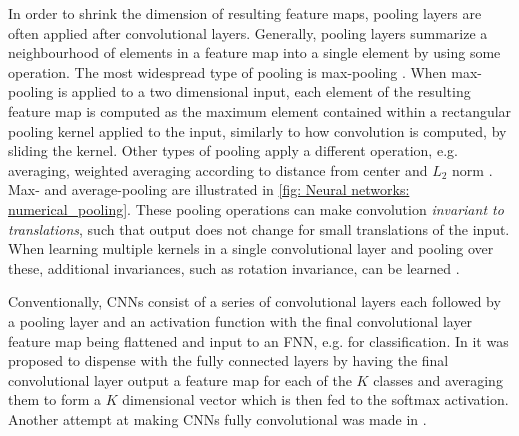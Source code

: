 In order to shrink the dimension of resulting feature maps, pooling layers are often applied after convolutional layers. Generally, pooling layers summarize a neighbourhood of elements in a feature map into a single element by using some operation. The most widespread type of pooling is max-pooling \cite{Zhou1988, Ranzato2007, Scherer2010}. 
When max-pooling is applied to a two dimensional input, each element of the resulting feature map is computed as the maximum element contained within a rectangular pooling kernel applied to the input, similarly to how convolution is computed, by sliding the kernel. Other types of pooling apply a different operation, e.g. averaging, weighted averaging according to distance from center and $L_2$ norm \cite{Goodfellow2016}. Max- and average-pooling are illustrated in \autoref{fig: Neural networks: numerical_pooling}. These pooling operations can make convolution \textit{invariant to translations}, such that output does not change for small translations of the input. When learning multiple kernels in a single convolutional layer and pooling over these, additional invariances, such as rotation invariance, can be learned \cite{Goodfellow2016}.

Conventionally, \glspl{CNN} consist of a series of convolutional layers each followed by a pooling layer and an activation function with the final convolutional layer feature map being flattened and input to an \gls{FNN}, e.g. for classification. In \cite{Lin2013} it was proposed to dispense with the fully connected layers by having the final convolutional layer output a feature map for each of the $K$ classes and averaging them to form a $K$ dimensional vector which is then fed to the softmax activation. Another attempt at making \glspl{CNN} fully convolutional was made in \cite{Long2015}.


